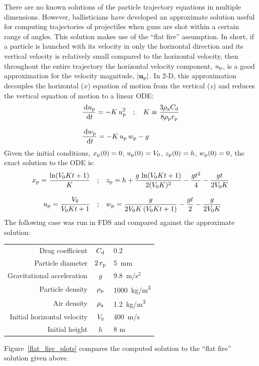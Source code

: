 \documentclass[11pt]{book}
\begin{document}
There are no known solutions of the particle trajectory equations in multiple dimensions. However, ballisticians have developed an approximate solution useful for computing trajectories of projectiles when guns are shot within a certain range of angles. This solution makes use of the ``flat fire'' assumption. In short, if a particle is launched with its velocity in only the horizontal direction and its vertical velocity is relatively small compared to the horizontal velocity, then throughout the entire trajectory the horizontal velocity component, $u_{\rm p}$, is a good approximation for the velocity magnitude, $|\mathbf{u_{\rm p}}|$. In 2-D, this approximation decouples the horizontal ($x$) equation of motion from the vertical ($z$) and reduces the vertical equation of motion to a linear ODE:
\begin{align}
   &\frac{\,\mathrm{d} u_{\rm p}}{\,\mathrm{d} t} = -K \, u_{\rm p}^2 \quad ;  \quad K \equiv \frac{3 \rho_{\rm a} C_{\rm d}}{8 \rho_{\rm p} r_{\rm p}} \\[.1in]
   &\frac{\,\mathrm{d} w_{\rm p}}{\,\mathrm{d} t} = -K \, u_{\rm p} \, w_{\rm p} - g
\end{align}
Given the initial conditions, $x_{\rm p}(0) = 0$, $u_{\rm p}(0) = V_0$, $z_{\rm p}(0) = h$, $w_{\rm p}(0) = 0$, the exact solution to the ODE is:
\begin{align}
    x_{\rm p} = \frac{\ln(V_0 K t + 1)}{K} \quad ;& \quad
    z_{\rm p} = h + \frac{g \, \ln(V_0 K t + 1)}{2 (V_0 K)^2} - \frac{g t^2}{4} - \frac{g t}{2 V_0 K} \\[.1in]
    u_{\rm p} = \frac{V_0}{V_0 K t + 1} \quad ;& \quad w_{\rm p} = \frac{g}{2 V_0 K \, (V_0 K t + 1)} - \frac{g t}{2} - \frac{g}{2 V_0 K}
\end{align}
The following case was run in FDS and compared against the approximate solution:
\begin{center}
\begin{tabular}{|r|c|l|}
\hline
Drag coefficient                  & $C_{\rm d}$          & 0.2 \\
Particle diameter                 & $2\, r_{\rm p}$      & 5~mm \\
Gravitational acceleration        & $g$                  & 9.8~m/s$^2$ \\
Particle density                  & $\rho_{\rm p}$       & 1000~\unit{kg/m^3} \\
Air density                       & $\rho_{\rm a}$       & 1.2~\unit{kg/m^3} \\
Initial horizontal velocity       & $V_0$                & 400~m/s \\
Initial height                    & $h$                  & 8 m \\
\hline
\end{tabular}
\end{center}
Figure~\ref{flat_fire_plots} compares the computed solution to the ``flat fire'' solution given above.
\end{document}
